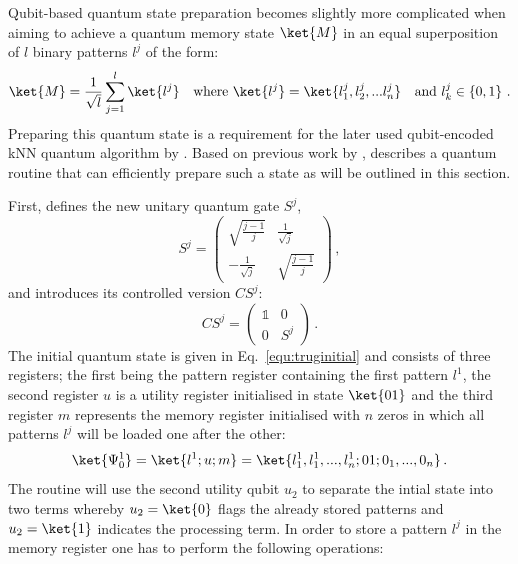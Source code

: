 Qubit-based quantum state preparation becomes slightly more complicated when aiming to achieve a quantum memory state $\ket{M}$ in an equal superposition of $l$ binary patterns $l^j$ of the form:
\begin{equation}
\label{equ:memorysuperpos}
\ket{M} = \frac{1}{\sqrt{l}}\sum^l_{j=1} \ket{l^j} \quad
\text{where } \ket{l^j} = \ket{l^j_1,l^j_2,...l^j_n} \quad \text{and } l^j_k \in \left\{0,1\right\}\, .
\end{equation}
Preparing this quantum state is a requirement for the later used qubit-encoded kNN quantum algorithm by . Based on previous work by ,  describes a quantum routine that can efficiently prepare such a state as will be outlined in this section.

\pagebreak
First,  defines the new unitary quantum gate $S^j$,
\begin{equation}
S^j = \begin{pmatrix}
\sqrt{\frac{j-1}{j}} & \frac{1}{\sqrt{j}} \\
-\frac{1}{\sqrt{j}} & \sqrt{\frac{j-1}{j}}
\end{pmatrix}\, ,
\end{equation}
and introduces its controlled version $CS^j$:
\begin{equation}
CS^j = \begin{pmatrix}
\mathbb{1} & 0 \\
0 & S^j
\end{pmatrix}\, .
\end{equation}
The initial quantum state is given in Eq.~\ref{equ:truginitial} and consists of three registers; the first being the pattern register containing the first pattern $l^1$, the second register $u$ is a utility register initialised in state $\ket{01}$ and the third register $m$ represents the memory register initialised with $n$ zeros in which all patterns $l^j$ will be loaded one after the other:
\begin{equation}
\label{equ:truginitial}
\ket{\Psi^1_0} = \ket{l^1;u;m} = \ket{l^1_1,l^1_1,...,l^1_n;01;0_1,...,0_n}\, .
\end{equation}
The routine will use the second utility qubit $u_2$ to separate the intial state into two terms whereby $u_2 = \ket{0}$ flags the already stored patterns and $u_2 = \ket{1}$ indicates the processing term. In order to store a pattern $l^j$ in the memory register one has to perform the following operations:

